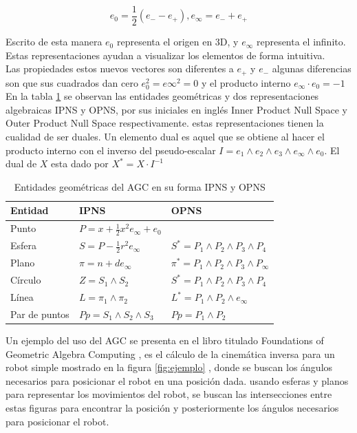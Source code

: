 \begin{equation}
e_0=\frac{1}{2}(e_- -e_+ ), e_\infty=e_- + e_+
\label{convBasis}
\end{equation}

Escrito de esta manera $e_0$ representa el origen en 3D, y $e_\infty$ representa el infinito. Estas representaciones ayudan a visualizar los elementos de forma intuitiva.\\

Las propiedades estos nuevos vectores son diferentes a $e_+$ y $e_-$ algunas diferencias son que sus cuadrados dan cero $e_0^2=e\infty^2=0$ y el producto interno $e_\infty \cdot e_0 = -1$\\

En la tabla \ref{AGCEntitis} se observan las entidades geométricas y dos representaciones algebraicas IPNS y OPNS, por sus iniciales en inglés Inner Product Null Space y Outer Product Null Space respectivamente. estas representaciones tienen la cualidad de ser duales. Un elemento dual es aquel que se obtiene al hacer el producto interno con el inverso del pseudo-escalar $I=e_1\wedge e_2 \wedge e_3 \wedge e_\infty \wedge e_0$. El dual de $X$ esta dado por $X^*=X \cdot I^{-1}$

\begin{table}[!htb]
	\centering
	\caption{Entidades geométricas del AGC en su forma IPNS y OPNS}
	\label{AGCEntitis}
	\begin{tabular}{lll}
		\hline
		Entidad       & IPNS & OPNS \\ \hline
		Punto         & $P=x+\frac{1}{2}x^2e_\infty+e_0$     &      \\
		Esfera        & $S=P-\frac{1}{2}r^2 e_\infty$ & $S^*=P_1\wedge P_2\wedge P_3\wedge P_4 $ \\
		Plano         & $\pi = n+de_\infty$     & $\pi^*=P_1\wedge P_2\wedge P_3\wedge P_\infty$      \\
		Círculo       & $Z=S_1\wedge S_2$     & $S^*=P_1\wedge P_2\wedge P_3\wedge P_4 $    \\
		Línea         & $L=\pi_1 \wedge \pi_2$     & $L^*=P_1 \wedge P_2 \wedge e_\infty$      \\
		Par de puntos & $Pp=S_1 \wedge S_2 \wedge S_3$     &    $Pp=P_1 \wedge P_2$  \\ \hline
	\end{tabular}
\end{table}


Un ejemplo del uso del AGC se presenta en el libro titulado Foundations of Geometric Algebra Computing \cite{FoundOfAGC}, es el cálculo de la cinemática inversa para un robot simple mostrado en la figura \ref{fig:ejemplo} , donde se buscan los ángulos necesarios para posicionar el robot en una posición dada. usando esferas y planos para representar los movimientos del robot, se buscan las intersecciones entre estas figuras para encontrar la posición y posteriormente los ángulos necesarios para posicionar el robot.\\


